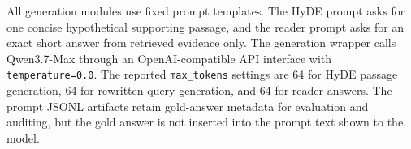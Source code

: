 All generation modules use fixed prompt templates. The HyDE prompt asks for one concise hypothetical supporting passage, and the reader prompt asks for an exact short answer from retrieved evidence only. The generation wrapper calls Qwen3.7-Max through an OpenAI-compatible API interface with \texttt{temperature=0.0}. The reported \texttt{max\_tokens} settings are 64 for HyDE passage generation, 64 for rewritten-query generation, and 64 for reader answers. The prompt JSONL artifacts retain gold-answer metadata for evaluation and auditing, but the gold answer is not inserted into the prompt text shown to the model.
